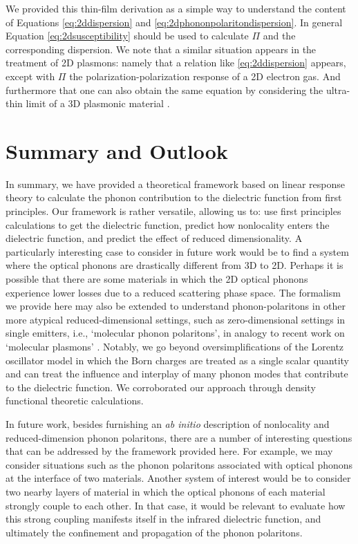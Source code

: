 \documentclass[aps,prb,twocolumn,
	groupedaddress,superscriptaddress,
	amsfonts,amssymb,amsmath,floatfix,
	citeautoscript]{revtex4-1}
\begin{document}
We provided this thin-film derivation as a simple way to understand the content of Equations \ref{eq:2ddispersion} and \ref{eq:2dphononpolaritondispersion}. In general Equation \ref{eq:2dsusceptibility} should be used to calculate $\Pi$ and the corresponding dispersion. We note that a similar situation appears in the treatment of 2D plasmons: namely that a relation like \ref{eq:2ddispersion} appears, except with $\Pi$ the polarization-polarization response of a 2D electron gas. And furthermore that one can also obtain the same equation by considering the ultra-thin limit of a 3D plasmonic material \cite{jablan2009plasmonics,jablan2013plasmons}.


\section{Summary and Outlook}

In summary, we have provided a theoretical framework based on linear response theory to calculate the phonon contribution to the dielectric function from first principles. Our framework is rather versatile, allowing us to: use first principles calculations to get the dielectric function, predict how nonlocality enters the dielectric function, and predict the effect of reduced dimensionality. A particularly interesting case to consider in future work would be to find a system where the optical phonons are drastically different from 3D to 2D. Perhaps it is possible that there are some materials in which the 2D optical phonons experience lower losses due to a reduced scattering phase space. The formalism we provide here may also be extended to understand phonon-polaritons in other more atypical reduced-dimensional settings, such as zero-dimensional settings in single emitters, i.e., `molecular phonon polaritons', in analogy to recent work on `molecular plasmons' \cite{manjavacas2013tunable,lauchner2015molecular}. Notably, we go beyond oversimplifications of the Lorentz oscillator model in which the Born charges are treated as a single scalar quantity and can treat the influence and interplay of many phonon modes that contribute to the dielectric function. We corroborated our approach through density functional theoretic calculations.

In future work, besides furnishing an \emph{ab initio} description of nonlocality and reduced-dimension phonon polaritons, there are a number of interesting questions that can be addressed by the framework provided here. For example, we may consider situations such as the phonon polaritons associated with optical phonons at the interface of two materials. Another system of interest would be to consider two nearby layers of material in which the optical phonons of each material strongly couple to each other. In that case, it would be relevant to evaluate how this strong coupling manifests itself in the infrared dielectric function, and ultimately the confinement and propagation of the phonon polaritons.
\end{document}

